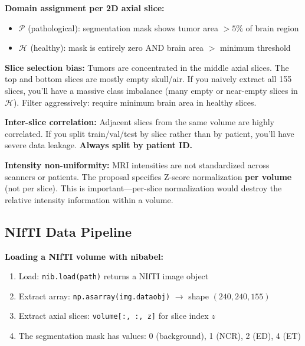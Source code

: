 \documentclass[11pt,a4paper]{article}
\theoremstyle{definition}
\begin{document}
\textbf{Domain assignment per 2D axial slice:}
\begin{itemize}
    \item $\mathcal{P}$ (pathological): segmentation mask shows tumor area $> 5\%$ of brain region
    \item $\mathcal{H}$ (healthy): mask is entirely zero AND brain area $>$ minimum threshold
\end{itemize}

\begin{edgecase}
\textbf{Slice selection bias:} Tumors are concentrated in the middle axial slices. The top and bottom slices are mostly empty skull/air. If you naively extract all 155 slices, you'll have a massive class imbalance (many empty or near-empty slices in $\mathcal{H}$). Filter aggressively: require minimum brain area in healthy slices.

\vspace{0.3em}
\textbf{Inter-slice correlation:} Adjacent slices from the same volume are highly correlated. If you split train/val/test by slice rather than by patient, you'll have severe data leakage. \textbf{Always split by patient ID.}

\vspace{0.3em}
\textbf{Intensity non-uniformity:} MRI intensities are not standardized across scanners or patients. The proposal specifies Z-score normalization \textbf{per volume} (not per slice). This is important---per-slice normalization would destroy the relative intensity information within a volume.
\end{edgecase}

\subsection{NIfTI Data Pipeline}

\textbf{Loading a NIfTI volume with nibabel:}
\begin{enumerate}
    \item Load: \texttt{nib.load(path)} returns a NIfTI image object
    \item Extract array: \texttt{np.asarray(img.dataobj)} $\to$ shape $(240, 240, 155)$
    \item Extract axial slices: \texttt{volume[:, :, z]} for slice index $z$
    \item The segmentation mask has values: 0 (background), 1 (NCR), 2 (ED), 4 (ET)
\end{enumerate}
\end{document}
